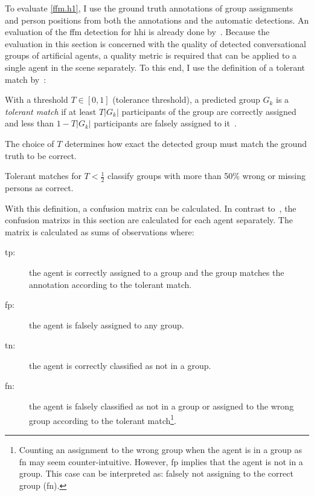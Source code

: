To evaluate \cref{ffm.h1}, I use the ground truth annotations of group assignments and person positions from both the annotations and the automatic detections.
An evaluation of the \gls{ffm} detection for \gls{hhi} is already done by~.
Because the evaluation in this section is concerned with the quality of detected \glspl{conversational group} of \glspl{artificial agent}, a quality metric is required that can be applied to a single agent in the scene separately.
To this end, I use the definition of a \gls{tolerant match} by~:
\begin{definition}
    \label{def.tm}
     With a threshold \(T \in [0,1]\) (\gls{tolerance threshold}), a predicted group \(G_k\) is a \emph{tolerant match} if at least \(T|G_k|\) participants of the group are correctly assigned and less than \(1-T|G_k|\) participants are falsely assigned to it~\cite[]{Setti2015}.
\end{definition}
The choice of \(T\) determines how exact the detected group must match the ground truth to be correct.
\begin{corollary}
    \label{cor.tm.1}
    Tolerant matches for \(T < \frac{1}{2}\) classify groups with more than 50\% wrong or missing persons as correct.
\end{corollary}
With this definition, a \gls{confusion matrix} can be calculated.
In contrast to~, the \glspl{confusion matrix} in this section are calculated for each agent separately.
The matrix is calculated as sums of observations where:
\begin{description}
    \item[\acrshort{tp}:] the agent is correctly assigned to a group and the group matches the annotation according to the \gls{tolerant match}.
    \item[\acrshort{fp}:] the agent is falsely assigned to any group.
    \item[\acrshort{tn}:] the agent is correctly classified as not in a group.
    \item[\acrshort{fn}:] the agent is falsely classified as not in a group or assigned to the wrong group according to the \gls{tolerant match}\footnote{Counting an assignment to the wrong group when the agent is in a group as \acrlong{fn} may seem counter-intuitive.
    However, \acrlong{fp} implies that the agent is not in a group.
    This case can be interpreted as: falsely not assigning to the correct group (\acrlong{fn}).
    }.
\end{description}

